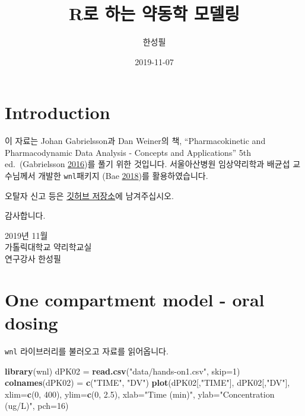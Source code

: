 \documentclass[
  9pt,
]{krantz}
\title{R로 하는 약동학 모델링}
\author{한성필}
\date{2019-11-07}
\newenvironment{Shaded}{\begin{snugshade}}{\end{snugshade}}
\newcommand{\DataTypeTok}[1]{\textcolor[rgb]{0.13,0.29,0.53}{#1}}
\newcommand{\DecValTok}[1]{\textcolor[rgb]{0.00,0.00,0.81}{#1}}
\newcommand{\FloatTok}[1]{\textcolor[rgb]{0.00,0.00,0.81}{#1}}
\newcommand{\KeywordTok}[1]{\textcolor[rgb]{0.13,0.29,0.53}{\textbf{#1}}}
\newcommand{\NormalTok}[1]{#1}
\newcommand{\StringTok}[1]{\textcolor[rgb]{0.31,0.60,0.02}{#1}}
\begin{document}
\maketitle

{
\hypersetup{linkcolor=}
\setcounter{tocdepth}{2}
\tableofcontents
}
\listoftables
\listoffigures
\hypertarget{introduction}{%
\chapter*{Introduction}\label{introduction}}


이 자료는 Johan Gabrielsson과 Dan Weiner의 책, ``Pharmacokinetic and Pharmacodynamic Data Analysis - Concepts and Applications'' 5th ed.~(Gabrielsson \protect\hyperlink{ref-gab}{2016})를 풀기 위한 것입니다. 서울아산병원 임상약리학과 배균섭 교수님께서 개발한 \texttt{wnl}패키지 (Bae \protect\hyperlink{ref-R-wnl}{2018})를 활용하였습니다.

오탈자 신고 등은 \href{https://github.com/pipetcpt/study-pkpd/issues}{깃허브 저장소}에 남겨주십시오.

감사합니다.

2019년 11월\\
가톨릭대학교 약리학교실\\
연구강사 한성필

\mainmatter

\hypertarget{one-compartment-model---oral-dosing}{%
\chapter{One compartment model - oral dosing}\label{one-compartment-model---oral-dosing}}

\texttt{wnl} 라이브러리를 불러오고 자료를 읽어옵니다.

\begin{Shaded}
\begin{Highlighting}[]
\KeywordTok{library}\NormalTok{(wnl)}
\NormalTok{dPK02 =}\StringTok{ }\KeywordTok{read.csv}\NormalTok{(}\StringTok{"data/hands-on1.csv"}\NormalTok{, }\DataTypeTok{skip=}\DecValTok{1}\NormalTok{)}
\KeywordTok{colnames}\NormalTok{(dPK02) =}\StringTok{ }\KeywordTok{c}\NormalTok{(}\StringTok{"TIME"}\NormalTok{, }\StringTok{"DV"}\NormalTok{)}
\KeywordTok{plot}\NormalTok{(dPK02[,}\StringTok{"TIME"}\NormalTok{], dPK02[,}\StringTok{"DV"}\NormalTok{], }\DataTypeTok{xlim=}\KeywordTok{c}\NormalTok{(}\DecValTok{0}\NormalTok{, }\DecValTok{400}\NormalTok{), }\DataTypeTok{ylim=}\KeywordTok{c}\NormalTok{(}\DecValTok{0}\NormalTok{, }\FloatTok{2.5}\NormalTok{), }
     \DataTypeTok{xlab=}\StringTok{"Time (min)"}\NormalTok{, }\DataTypeTok{ylab=}\StringTok{"Concentration (ug/L)"}\NormalTok{, }\DataTypeTok{pch=}\DecValTok{16}\NormalTok{)}
\end{Highlighting}
\end{Shaded}
\end{document}
